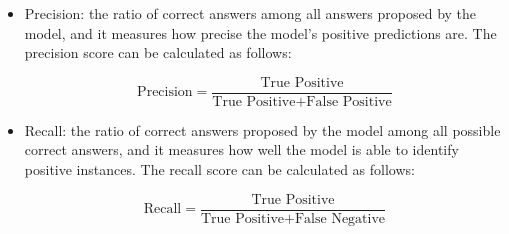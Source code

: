     \begin{itemize}
        \item Precision: the ratio of correct answers among all answers proposed by the model, and it measures how precise the model's positive predictions are. The precision score can be calculated as follows:
        
        \begin{equation}
            \text{Precision} = \frac{\text{True Positive}}{\text{True Positive} + \text{False Positive}}
        \end{equation}
        
        \item Recall: the ratio of correct answers proposed by the model among all possible correct answers, and it measures how well the model is able to identify positive instances. The recall score can be calculated as follows:

        \begin{equation}
            \text{Recall} = \frac{\text{True Positive}}{\text{True Positive} + \text{False Negative}}
        \end{equation}
    \end{itemize}


